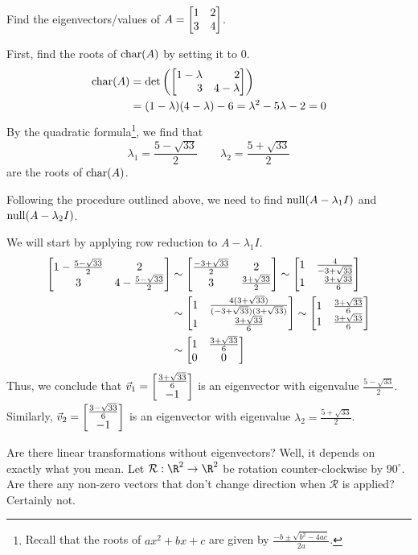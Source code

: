 \begin{example}
	Find the eigenvectors/values of $A=\mat{1&2\\3&4}$.

	First, find the roots of $\operatorname{char}(A)$ by setting it to $0$.
	\begin{align*}
	    \Char(A)&=\det\left(\mat{1-\lambda&2\\3&4-\lambda}\right)\\
	            &=(1-\lambda)(4-\lambda)-6=\lambda^2-5\lambda-2=0
	\end{align*}
	By the quadratic formula\footnote{ Recall that the
	roots of $ax^2+bx+c$ are given by $\frac{-b\pm\sqrt{b^2-4ac}}{2a}$.}, we find that
	\[\lambda_1=\frac{5-\sqrt{33}}{2}\qquad\lambda_2=\frac{5+\sqrt{33}}{2}\]
	are the roots of $\operatorname{char}(A)$.
	
	
	Following the procedure outlined above, we need to
	find $\operatorname{null}(A-\lambda_1I)$ and $\operatorname{null}(A-\lambda_2I)$.
	
	We will start by applying row reduction to $A-\lambda_1I$.
	\begin{align*}
	    \matc{1-\frac{5-\sqrt{33}}{2}&2\\3&4-\frac{5-\sqrt{33}}{2}} & \sim
	    \matc{\frac{-3+\sqrt{33}}{2}&2\\3&\frac{3+\sqrt{33}}{2}} \sim \mat{1&\frac{4}{-3+\sqrt{33}}\\1&\frac{3+\sqrt{33}}{6}}\\
	    & \sim \matc{1&\frac{4(3+\sqrt{33})}{(-3+\sqrt{33})(3+\sqrt{33})}\\1&\frac{3+\sqrt{33}}{6}} \sim \mat{1&\frac{3+\sqrt{33}}{6}\\1&\frac{3+\sqrt{33}}{6}}\\
	    & \sim \matc{1&\frac{3+\sqrt{33}}{6}\\0&0}
	\end{align*}
	Thus, we conclude that $\vec v_1 = \begin{bmatrix}\frac{3+\sqrt{33}}{6}\\-1\end{bmatrix}$ is an eigenvector with eigenvalue $\frac{5-\sqrt{33}}{2}$. Similarly, $\vec v_2=\begin{bmatrix}\frac{3-\sqrt{33}}{6}\\-1\end{bmatrix}$ is an eigenvector with eigenvalue $\lambda_2 = \frac{5+\sqrt{33}}{2}$.
\end{example}


Are there linear transformations without eigenvectors? Well, it
depends on exactly what you mean. Let $\mathcal R:\R^2\to\R^2$
be rotation counter-clockwise by $90^\circ$. Are there any non-zero
vectors that don't change direction when $\mathcal R$ is applied?
Certainly not.

